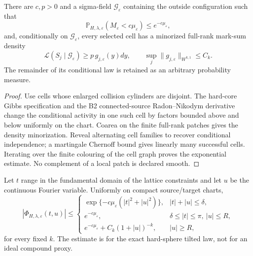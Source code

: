 \begin{lemma}
\label{lem:r9-b1-regeneration}
There are $c,p>0$ and a sigma-field $\mathcal G_\varepsilon$ containing the
outside configuration such that
\[
 \mathbb P_{H,\lambda,\varepsilon}
 \left(M_\varepsilon<c\mu_\varepsilon\right)
 \le e^{-c\mu_\varepsilon},
\]
and, conditionally on $\mathcal G_\varepsilon$, every selected cell has a
minorized full-rank mark-sum density
\[
 \mathcal L(S_j\mid\mathcal G_\varepsilon)
 \ge p\,g_{j,\varepsilon}(y)dy,
 \qquad
 \sup_j\|g_{j,\varepsilon}\|_{W^{k,1}}\le C_k.
\]
The remainder of its conditional law is retained as an arbitrary probability
measure.
\end{lemma}

\begin{proof}
Use cells whose enlarged collision cylinders are disjoint.  The hard-core
Gibbs specification and the B2 connected-source Radon--Nikodym derivative
change the conditional activity in one such cell by factors bounded above and
below uniformly on the chart.  Coarea on the finite full-rank patches gives
the density minorization.  Reveal alternating cell families to recover
conditional independence; a martingale Chernoff bound gives linearly many
successful cells.  Iterating over the finite colouring of the cell graph
proves the exponential estimate.  No complement of a local patch is declared
smooth.
\end{proof}

\begin{theorem}
\label{thm:r9-b1-fourier}
Let $t$ range in the fundamental domain of the lattice constraints and let
$u$ be the continuous Fourier variable.  Uniformly on compact source/target
charts,
\[
 \left|\Phi_{H,\lambda,\varepsilon}(t,u)\right|
 \le
 \begin{cases}
  \exp\{-c\mu_\varepsilon(|t|^2+|u|^2)\},
   & |t|+|u|\le\delta,\\
  e^{-c\mu_\varepsilon},
   & \delta\le |t|\le\pi,\ |u|\le R,\\
  e^{-c\mu_\varepsilon}+C_k(1+|u|)^{-k},
   & |u|\ge R,
 \end{cases}
\]
for every fixed $k$.  The estimate is for the exact hard-sphere tilted law,
not for an ideal compound proxy.
\end{theorem}

